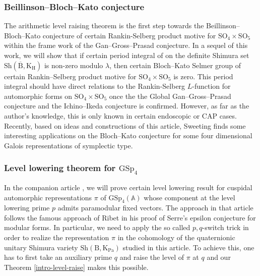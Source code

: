 \documentclass[10pt]{amsart}
\numberwithin{equation}{section}
\theoremstyle{definition}
\def\GSp{\mathrm{GSp}}
\def\SO{\mathrm{SO}}
\def\Pa{\mathrm{Pa}}
\def\rmB{\mathrm{B}}
\def\rmH{\mathrm{H}}
\def\rmK{\mathrm{K}}
\def\Sh{\mathrm{Sh}}
\begin{document}
\subsubsection{Beillinson--Bloch--Kato conjecture} The arithmetic level raising theorem is the first step towards the Beillinson--Bloch--Kato conjecture of certain Rankin-Selberg product motive for $\SO_{4}\times\SO_{5}$ within the frame work of the Gan--Gross--Prasad conjecture. In a sequel of this work, we will show that if certain period integral of on the definite Shimura set $\Sh(\overline{\rmB}, \rmK_{\rmH})$ is non-zero modulo $\lambda$, then certain Bloch--Kato Selmer group of certain Rankin--Selberg product motive for $\SO_{4}\times\SO_{5}$ is zero. This period integral should have direct relations to the Rankin-Selberg  $L$-function for automorphic forms on $\SO_{4}\times\SO_{5}$ once the the Global Gan--Gross--Prasad conjecture and the Ichino--Ikeda conjecture \cite{Ichino-Ikeda} is confirmed. However, as far as the author's knowledge, this is only known in certain endoscopic or CAP cases. Recently, based on ideas and constructions of this article, Sweeting \cite{Sweeting} finds some interesting applications on the Bloch--Kato conjecture for some four dimensional Galois representations of symplectic type.

\subsubsection{Level lowering theorem for $\GSp_{4}$} In the companion article \cite{Wange}, we will prove certain level lowering result for cuspidal automorphic representations $\pi$ of $\GSp_{4}(\mathbb{A})$ whose component at the level lowering prime $p$ admits paramodular fixed vectors.  The approach in that article follows the famous approach of Ribet in his proof of Serre's epsilon conjecture for modular forms. In particular, we need to apply the so called $p, q$-switch trick in order to realize the representation $\pi$ in the cohomology of the quaternionic unitary Shimura variety $\Sh(\rmB, \rmK_{\Pa})$ studied in this article. To achieve this, one has to first take an auxiliary prime $q$ and raise the level of $\pi$ at $q$ and our Theorem \ref{intro-level-raise} makes this possible. 
\end{document}
